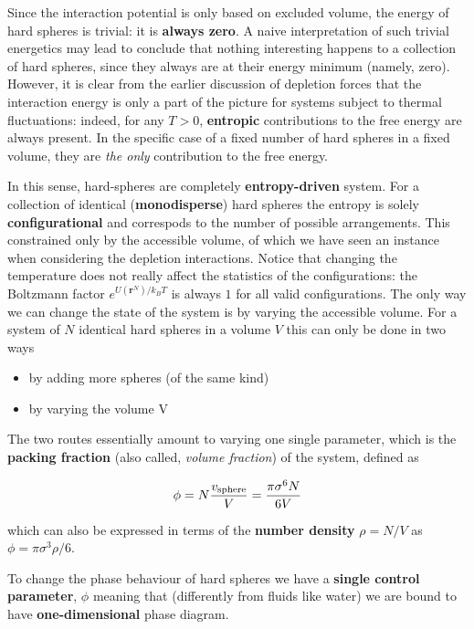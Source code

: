 \documentclass[
  letterpaper,
  enabledeprecatedfontcommands]{report}
\providecommand{\tightlist}{%
  \setlength{\itemsep}{0pt}\setlength{\parskip}{0pt}}
\begin{document}
Since the interaction potential is only based on excluded volume, the
energy of hard spheres is trivial: it is \textbf{always zero}. A naive
interpretation of such trivial energetics may lead to conclude that
nothing interesting happens to a collection of hard spheres, since they
always are at their energy minimum (namely, zero). However, it is clear
from the earlier discussion of depletion forces that the interaction
energy is only a part of the picture for systems subject to thermal
fluctuations: indeed, for any \(T>0\), \textbf{entropic} contributions
to the free energy are always present. In the specific case of a fixed
number of hard spheres in a fixed volume, they are \emph{the only}
contribution to the free energy.

In this sense, hard-spheres are completely \textbf{entropy-driven}
system. For a collection of identical (\textbf{monodisperse}) hard
spheres the entropy is solely \textbf{configurational} and correspods to
the number of possible arrangements. This constrained only by the
accessible volume, of which we have seen an instance when considering
the depletion interactions. Notice that changing the temperature does
not really affect the statistics of the configurations: the Boltzmann
factor \(e^{U(\mathbf{r}^N)/k_BT}\) is always \(1\) for all valid
configurations. The only way we can change the state of the system is by
varying the accessible volume. For a system of \(N\) identical hard
spheres in a volume \(V\) this can only be done in two ways

\begin{itemize}
\tightlist
\item
  by adding more spheres (of the same kind)
\item
  by varying the volume V
\end{itemize}

The two routes essentially amount to varying one single parameter, which
is the \textbf{packing fraction} (also called, \emph{volume fraction})
of the system, defined as

\[\phi = N\dfrac{v_{\rm sphere}}{V} = \dfrac{\pi \sigma^6 N}{6V}\]

which can also be expressed in terms of the \textbf{number density}
\(\rho=N/V\) as \(\phi=\pi\sigma^3\rho/6\).

To change the phase behaviour of hard spheres we have a \textbf{single
control parameter}, \(\phi\) meaning that (differently from fluids like
water) we are bound to have \textbf{one-dimensional} phase diagram.
\end{document}
